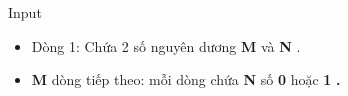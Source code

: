 Input  
\begin{itemize}
	\item     Dòng 1: Chứa 2 số nguyên dương    \textbf{     M    }    và    \textbf{     N    }    .   
	\item \textbf{     M    }    dòng tiếp theo: mỗi dòng chứa    \textbf{     N    }    số    \textbf{     0    }    hoặc    \textbf{     1    }\textbf{     .    }
\end{itemize}